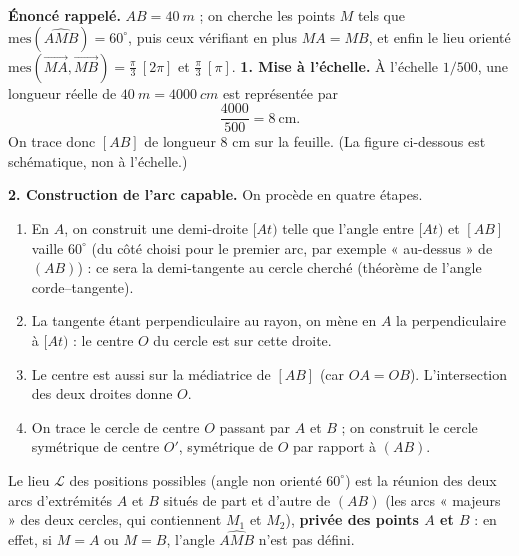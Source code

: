 \documentclass[11pt]{article}
\newcommand{\cle}[1]{{\popxbold\color{popdark}#1}}
\begin{document}
\begin{exoresolu}
\textbf{Énoncé rappelé.} $AB = \SI{40}{m}$ ; on cherche les points $M$ tels que $\mathrm{mes}(\widehat{AMB}) = 60^{\circ}$, puis ceux vérifiant en plus $MA = MB$, et enfin le lieu orienté $\mathrm{mes}(\overrightarrow{MA},\overrightarrow{MB}) = \frac{\pi}{3}\ [2\pi]$ et $\frac{\pi}{3}\ [\pi]$.
\tcblower
\textbf{1. Mise à l'échelle.} À l'échelle $1/500$, une longueur réelle de $\SI{40}{m} = \SI{4000}{cm}$ est représentée par
\[ \frac{4000}{500} = 8\ \text{cm}. \]
On trace donc $[AB]$ de longueur $8$ cm sur la feuille. (La figure ci-dessous est schématique, non à l'échelle.)

\textbf{2. Construction de l'arc capable.} On procède en quatre étapes.
\begin{enumerate}
\item En $A$, on construit une demi-droite $[At)$ telle que l'angle entre $[At)$ et $[AB]$ vaille $60^{\circ}$ (du côté choisi pour le premier arc, par exemple « au-dessus » de $(AB)$) : ce sera la \cle{demi-tangente} au cercle cherché (théorème de l'angle corde–tangente).
\item La tangente étant perpendiculaire au rayon, on mène en $A$ la perpendiculaire à $[At)$ : le centre $O$ du cercle est sur cette droite.
\item Le centre est aussi sur la médiatrice de $[AB]$ (car $OA = OB$). L'intersection des deux droites donne $O$.
\item On trace le cercle de centre $O$ passant par $A$ et $B$ ; on construit le cercle symétrique de centre $O'$, symétrique de $O$ par rapport à $(AB)$.
\end{enumerate}
Le lieu $\mathcal{L}$ des positions possibles (angle non orienté $60^{\circ}$) est la réunion des deux arcs d'extrémités $A$ et $B$ situés de part et d'autre de $(AB)$ (les arcs « majeurs » des deux cercles, qui contiennent $M_1$ et $M_2$), \textbf{privée des points $A$ et $B$} : en effet, si $M = A$ ou $M = B$, l'angle $\widehat{AMB}$ n'est pas défini.

\begin{center}
\begin{popfigure}
\end{popfigure}
\end{center}
\end{exoresolu}
\end{document}
